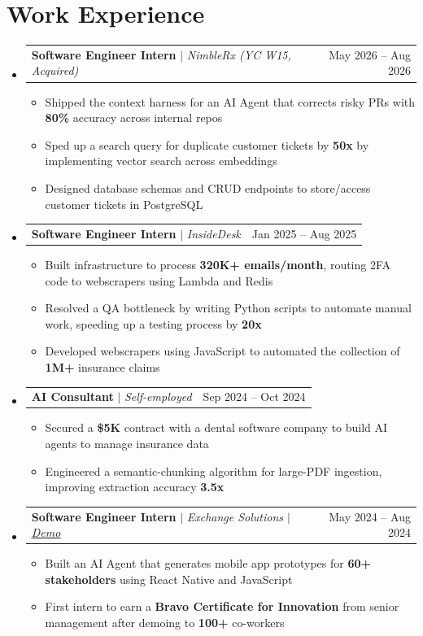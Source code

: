 \documentclass[letterpaper,11pt]{article}
\makeatletter
\newcommand{\resumeItem}[1]{
  \item\small{
    {#1 \vspace{-0.6pt}}
  }
}
\newcommand{\resumeSubheadingB}[3]{
  \vspace{0pt}\item
    \begin{tabular*}{0.97\textwidth}[t]{l@{\extracolsep{\fill}}r}
      \textbf{#1} $|$ \textit{#3} & #2 \\
    \end{tabular*}\vspace{-7pt}
}
\newcommand{\resumeSubHeadingListStart}{\begin{itemize}[leftmargin=0.15in, label={}]}
\newcommand{\resumeSubHeadingListEnd}{\end{itemize}}
\newcommand{\resumeItemListStart}{\begin{itemize}}
\newcommand{\resumeItemListEnd}{\end{itemize}\vspace{-7pt}}
\makeatother
\begin{document}
\section{Work Experience}
  \resumeSubHeadingListStart
    \resumeSubheadingB{Software Engineer Intern}{May 2026 -- Aug 2026}{NimbleRx (YC W15, Acquired)}
      \resumeItemListStart
        \resumeItem{Shipped the context harness for an AI Agent that corrects risky PRs with \textbf{80\%} accuracy across internal repos}
        \resumeItem{Sped up a search query for duplicate customer tickets by \textbf{50x} by implementing vector search across embeddings}
        \resumeItem{Designed database schemas and CRUD endpoints to store/access customer tickets in PostgreSQL}
      \resumeItemListEnd
    \resumeSubheadingB{Software Engineer Intern}{Jan 2025 -- Aug 2025}{InsideDesk}
      \resumeItemListStart
        \resumeItem{Built infrastructure to process \textbf{320K+ emails/month}, routing 2FA code to webscrapers using Lambda and Redis}
        \resumeItem{Resolved a QA bottleneck by writing Python scripts to automate manual work, speeding up a testing process by \textbf{20x}}
        \resumeItem{Developed webscrapers using JavaScript to automated the collection of \textbf{1M+} insurance claims}
      \resumeItemListEnd
    \resumeSubheadingB{AI Consultant}{Sep 2024 -- Oct 2024}{Self-employed}
      \resumeItemListStart
        \resumeItem{Secured a \textbf{\$5K} contract with a dental software company to build AI agents to manage insurance data}
        \resumeItem{Engineered a semantic-chunking algorithm for large-PDF ingestion, improving extraction accuracy \textbf{3.5x}}
      \resumeItemListEnd
    \resumeSubheadingB{Software Engineer Intern}{May 2024 -- Aug 2024}{Exchange Solutions $|$ \underline{\href{https://www.youtube.com/watch?v=mMaEmro4iEw}{Demo}}}
      \resumeItemListStart
        \resumeItem{Built an AI Agent that generates mobile app prototypes for \textbf{60+ stakeholders} using React Native and JavaScript}
        \resumeItem{First intern to earn a \textbf{Bravo Certificate for Innovation} from senior management after demoing to \textbf{100+} co-workers}
      \resumeItemListEnd\vspace{-10pt}
  \resumeSubHeadingListEnd
\end{document}
